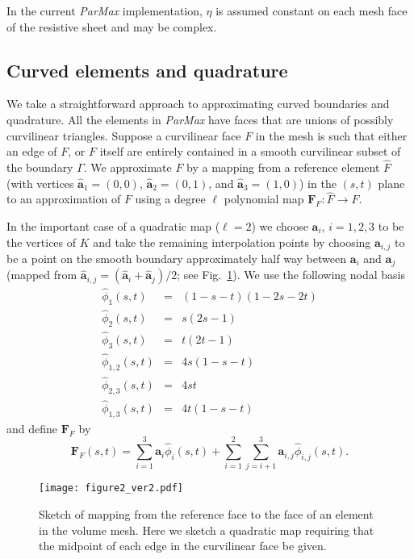 \documentclass[a4paper,12pt]{article}
\newcommand{\bfF}{\mathbf{F}}
\newcommand{\bfa}{\mathbf{a}}
\begin{document}
In the current \emph{ParMax} implementation,  $\eta$ is assumed constant on each mesh face of the resistive sheet and may be complex.

\subsection{Curved elements and quadrature}\label{CE&Q}
We take a straightforward approach to approximating curved boundaries and quadrature.
All the elements in \emph{ParMax} have faces that are unions of possibly curvilinear triangles.  Suppose a curvilinear face $F$ in the mesh is such that either an edge of $F$, or $F$ itself are entirely contained in a smooth curvilinear subset of the boundary $\Gamma$. We approximate $F$ by a mapping from a reference element $\hat{F}$ (with vertices $\widehat{\bfa}_1=(0,0)$, $\widehat{\bfa}_2=(0,1)$, and $\widehat{\bfa}_3=(1,0)$) in the $(s,t)$ plane to an approximation of $F$ using a degree
$\ell$ polynomial map $\bfF_F:\hat{F}\to F$. 

In the important case of a quadratic map ($\ell=2$) 
we choose $\bfa_{i}$, $i=1,2,3$ to be the vertices of $K$ and take the remaining interpolation points by choosing $\bfa_{i,j}$ to be a point on the smooth boundary approximately half way between $\bfa_i$ and $\bfa_j$ (mapped from $\widehat{\bfa}_{i,j}=(\widehat{\bfa}_{i}+\widehat{\bfa}_j)/2$; see Fig.~\ref{fig:quadmap}). We use the following nodal basis
\begin{eqnarray*}
\hat{\phi}_1(s,t)&=&(1-s-t)(1-2s-2t)\\
\hat{\phi}_2(s,t)&=&s(2s-1)\\
\hat{\phi}_3(s,t)&=&t(2t-1)\\
\hat{\phi}_{1,2}(s,t)&=&4s(1-s-t)\\
\hat{\phi}_{2,3}(s,t)&=&4st\\
\hat{\phi}_{1,3}(s,t)&=&4t(1-s-t)
\end{eqnarray*}
and define $\bfF_F$ by 
\begin{equation}
\bfF_F(s,t)=\sum_{i=1}^3\bfa_{i}\hat{\phi}_i(s,t)+\sum_{i=1}^2\sum_{j=i+1}^3\bfa_{i,j}\hat{\phi}_{i,j}(s,t).
\end{equation}

\begin{figure}
\begin{center}
    \texttt{[image: figure2\_ver2.pdf]} 
\end{center}
\caption{Sketch of mapping from the reference face to the face of an element in the volume mesh.  Here we sketch a quadratic map requiring that the midpoint of each edge in the curvilinear face be given.}
\label{fig:quadmap}
\end{figure}
\end{document}
